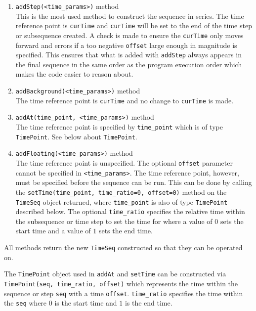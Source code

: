 \begin{enumerate}
\item \lstinline{addStep(<time_params>)} method\\
  This is the most used method to construct the sequence in series.
  The time reference point is \lstinline{curTime} and
  \lstinline{curTime} will be set to the end of the time step or subsequence created.
  A check is made to ensure the \lstinline{curTime} only moves forward and
  errors if a too negative \lstinline{offset} large enough in magnitude is specified.
  This ensures that what is added with \lstinline{addStep} always appears in the final
  sequence in the same order as the program execution order
  which makes the code easier to reason about.
\item \lstinline{addBackground(<time_params>)} method\\
  The time reference point is \lstinline{curTime} and no change to \lstinline{curTime} is made.
\item \lstinline{addAt(time_point, <time_params>)} method\\
  The time reference point is specified by \lstinline{time_point}
  which is of type \lstinline{TimePoint}.
  See below about \lstinline{TimePoint}.
\item \lstinline{addFloating(<time_params>)} method\\
  The time reference point is unspecified.
  The optional \lstinline{offset} parameter cannot be specified in \lstinline{<time_params>}.
  The time reference point, however, must be specified before the sequence can be run.
  This can be done by calling the \lstinline{setTime(time_point, time_ratio=0, offset=0)} method
  on the \lstinline{TimeSeq} object returned,
  where \lstinline{time_point} is also of type \lstinline{TimePoint} described below.
  The optional \lstinline{time_ratio} specifies the relative time within the subsequence
  or time step to set the time for where a value of $0$ sets the start time
  and a value of $1$ sets the end time.
\end{enumerate}
All methods return the new \lstinline{TimeSeq} constructed so that they can be operated on.

The \lstinline{TimePoint} object used in \lstinline{addAt} and \lstinline{setTime}
can be constructed via \lstinline{TimePoint(seq, time_ratio, offset)}
which represents the time within the sequence or step \lstinline{seq}
with a time \lstinline{offset}.
\lstinline{time_ratio} specifies the time within the \lstinline{seq} where $0$ is the start time
and $1$ is the end time.

